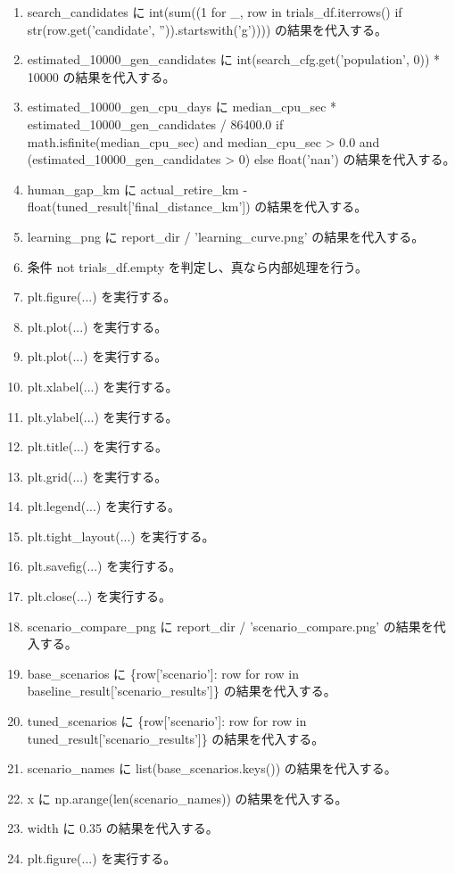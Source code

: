\documentclass[a4paper,11pt]{article}
\begin{document}
\begin{enumerate}[leftmargin=1.8em]
\item search\_candidates に int(sum((1 for \_, row in trials\_df.iterrows() if str(row.get('candidate', '')).startswith('g')))) の結果を代入する。
\item estimated\_10000\_gen\_candidates に int(search\_cfg.get('population', 0)) * 10000 の結果を代入する。
\item estimated\_10000\_gen\_cpu\_days に median\_cpu\_sec * estimated\_10000\_gen\_candidates / 86400.0 if math.isfinite(median\_cpu\_sec) and median\_cpu\_sec > 0.0 and (estimated\_10000\_gen\_candidates > 0) else float('nan') の結果を代入する。
\item human\_gap\_km に actual\_retire\_km - float(tuned\_result['final\_distance\_km']) の結果を代入する。
\item learning\_png に report\_dir / 'learning\_curve.png' の結果を代入する。
\item 条件 not trials\_df.empty を判定し、真なら内部処理を行う。
\item   plt.figure(...) を実行する。
\item   plt.plot(...) を実行する。
\item   plt.plot(...) を実行する。
\item   plt.xlabel(...) を実行する。
\item   plt.ylabel(...) を実行する。
\item   plt.title(...) を実行する。
\item   plt.grid(...) を実行する。
\item   plt.legend(...) を実行する。
\item   plt.tight\_layout(...) を実行する。
\item   plt.savefig(...) を実行する。
\item   plt.close(...) を実行する。
\item scenario\_compare\_png に report\_dir / 'scenario\_compare.png' の結果を代入する。
\item base\_scenarios に \{row['scenario']: row for row in baseline\_result['scenario\_results']\} の結果を代入する。
\item tuned\_scenarios に \{row['scenario']: row for row in tuned\_result['scenario\_results']\} の結果を代入する。
\item scenario\_names に list(base\_scenarios.keys()) の結果を代入する。
\item x に np.arange(len(scenario\_names)) の結果を代入する。
\item width に 0.35 の結果を代入する。
\item plt.figure(...) を実行する。

\end{enumerate}
\end{document}
